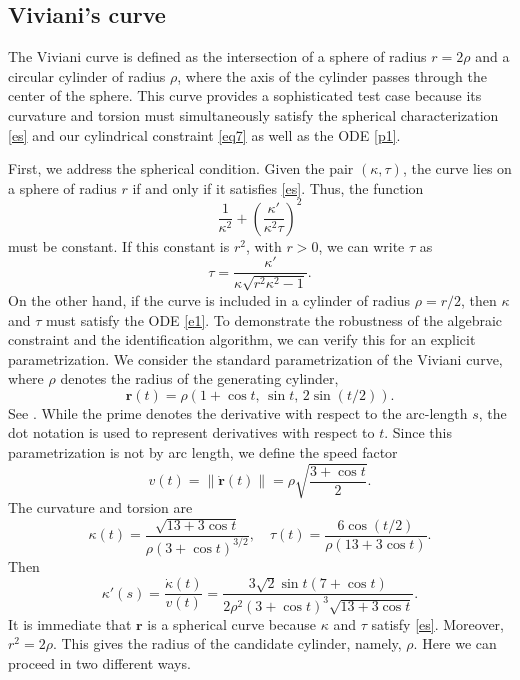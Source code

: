 \documentclass[a4paper,12pt]{amsart}
\theoremstyle{plain}
\theoremstyle{definition}
\newcommand{\bfr}{\mathbf{r}}
\begin{document}
 

 
\subsection{Viviani's curve} 
   

 
The Viviani curve is defined as the intersection of a sphere of radius $r=2\rho$ and a circular cylinder of radius $\rho$, where the axis of the cylinder  passes through the center of the sphere. This curve provides a sophisticated test case because its curvature and torsion    must simultaneously satisfy the spherical characterization \eqref{es} and our cylindrical constraint \eqref{eq7} as well as  the ODE \eqref{p1}.  


 
First, we address the spherical condition.   Given the pair $(\kappa, \tau)$, the curve lies on a sphere of radius $r$ if and only if it satisfies \eqref{es}. Thus, the function
\begin{equation*}
  \frac{1}{\kappa^2} + \left( \frac{\kappa'}{\kappa^2 \tau} \right)^2  
\end{equation*}
must be constant. If this constant is $r^2$, with $r>0$,   we can write $\tau$ as 
$$
    \tau = \frac{\kappa'}{\kappa \sqrt{r^2 \kappa^2 - 1}}.
$$
On the other hand, if   the curve is included in a cylinder of radius $\rho=r/2$, then $\kappa$ and $\tau$ must satisfy the ODE \eqref{e1}. To demonstrate the robustness of the algebraic constraint and the identification algorithm, we can verify this for an explicit parametrization. We consider the standard parametrization of the Viviani curve, where $\rho$ denotes the radius of the generating cylinder,
\begin{equation*}
    \mathbf{r}(t) = \rho \left( 1 + \cos t, \, \sin t, \, 2 \sin(t/2) \right).
\end{equation*}
See \cite{gray}. While the prime denotes the derivative with respect to the arc-length $s$, the dot notation is used to represent derivatives with respect to $t$.  Since this parametrization is not by arc length, we define the speed factor 
\begin{equation*}
    v(t) = \|\dot{\mathbf{r}}(t)\|= \rho \sqrt{\frac{3 + \cos t}{2}}.
\end{equation*}
The curvature and torsion are 
$$
    \kappa(t) = \frac{\sqrt{13 + 3\cos t}}{\rho (3 + \cos t)^{3/2}}, \quad \tau(t) = \frac{6 \cos(t/2)}{\rho (13 + 3\cos t)}.
$$
Then
$$
    \kappa'(s) = \frac{\dot{\kappa}(t)}{v(t)} = \frac{3\sqrt{2} \sin t (7 + \cos t)}{2\rho^2 (3 + \cos t)^{3} \sqrt{13 + 3\cos t}}.
$$
It is immediate that   $\bfr$ is a spherical curve because $\kappa$ and $\tau$ satisfy   \eqref{es}. Moreover,   $r^2 =   2\rho$. This gives the   radius of the candidate cylinder, namely, $\rho$. Here we can proceed in two different ways. 
\end{document}

